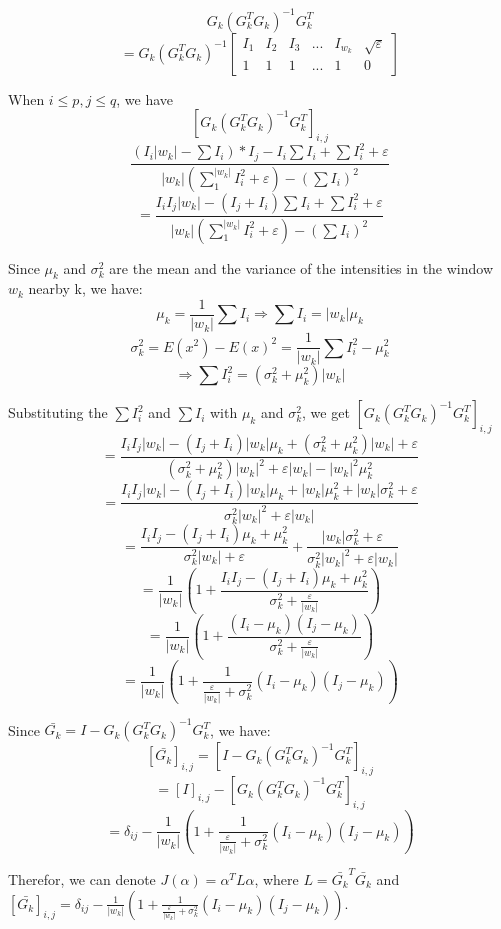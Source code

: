 \documentclass[11pt,letterpaper]{article}
\begin{document}
$$G_k(G_k^TG_k)^{-1}G_k^T $$
$$= G_k(G_k^TG_k)^{-1}
  \begin{bmatrix}
    I_1 & I_2 & I_3 & ... & I_{w_k} & \sqrt{\varepsilon}\\
    1 & 1 & 1 & ... & 1 & 0 
  \end{bmatrix} $$

When $i \le p, j \le q$, we have 
$$[G_k(G_k^TG_k)^{-1}G_k^T]_{i, j} $$
$$ \frac{(I_i |w_k| - \sum I_i) * I_j - I_i \sum I_i + \sum I_i^2 + \varepsilon}{|w_k|(\sum_{1}^{|w_k|} I_i^2 + \varepsilon) - (\sum I_i)^2}$$
$$= \frac{I_i I_j |w_k| - (I_j + I_i)\sum I_i + \sum I_i^2 + \varepsilon}{|w_k|(\sum_{1}^{|w_k|} I_i^2 + \varepsilon) - (\sum I_i)^2}$$

Since $\mu_k$ and $\sigma_k^2$ are the mean and the variance of the intensities in the window $w_k$  nearby k, we have:
$$\mu_k = \frac{1}{|w_k|}\sum I_i \Rightarrow \sum I_i = |w_k|\mu_k$$
$$\sigma_k^2 = E(x^2) - E(x)^2 = \frac{1}{|w_k|}\sum I_i^2 - \mu_k^2 $$
$$\Rightarrow \sum I_i^2 = (\sigma_k^2 + \mu_k^2)|w_k|$$

Substituting the $\sum I_i^2$ and $\sum I_i$ with $\mu_k$ and $\sigma_k^2$, we get
$[G_k(G_k^TG_k)^{-1}G_k^T]_{i, j}$
$$= \frac{I_i I_j |w_k| - (I_j + I_i)|w_k|\mu_k + (\sigma_k^2 + \mu_k^2)|w_k| + \varepsilon}{(\sigma_k^2 + \mu_k^2)|w_k|^2 + \varepsilon|w_k| - |w_k|^2\mu_k^2} $$
$$ = \frac{I_i I_j |w_k| - (I_j + I_i)|w_k|\mu_k + |w_k|\mu_k^2 + |w_k|\sigma_k^2 + \varepsilon}{\sigma_k^2|w_k|^2 + \varepsilon|w_k|}$$
$$ = \frac{I_i I_j - (I_j + I_i)\mu_k + \mu_k^2}{\sigma_k^2|w_k| + \varepsilon} + 
\frac{|w_k|\sigma_k^2 + \varepsilon}{\sigma_k^2|w_k|^2 + \varepsilon|w_k|}$$
$$ = \frac{1}{|w_k|}(1 + \frac{I_i I_j - (I_j + I_i)\mu_k + \mu_k^2}{\sigma_k^2 + \frac{\varepsilon}{|w_k|}})$$
$$= \frac{1}{|w_k|}(1 + \frac{(I_i - \mu_k)(I_j - \mu_k)}{\sigma_k^2 + \frac{\varepsilon}{|w_k|}})$$
$$= \frac{1}{|w_k|}(1 + \frac{1}{\frac{\varepsilon}{|w_k|} + \sigma_k^2}(I_i - \mu_k)(I_j - \mu_k))$$

Since $\bar{G_k} = I - G_k(G_k^TG_k)^{-1}G_k^T$, we have:
$$[\bar{G_k}]_{i,j} = [I - G_k(G_k^TG_k)^{-1}G_k^T]_{i,j} $$
$$= [I]_{i,j} - [G_k(G_k^TG_k)^{-1}G_k^T]_{i,j}$$
$$= \delta_{ij} - \frac{1}{|w_k|}(1 + \frac{1}{\frac{\varepsilon}{|w_k|} + \sigma_k^2}(I_i - \mu_k)(I_j - \mu_k))$$

Therefor, we can denote $J(\alpha) = \alpha^T L \alpha$, where $L = \bar{G_k}^T\bar{G_k}$ and $[\bar{G_k}]_{i,j} = \delta_{ij} - \frac{1}{|w_k|}(1 + \frac{1}{\frac{\varepsilon}{|w_k|} + \sigma_k^2}(I_i - \mu_k)(I_j - \mu_k)).$
\end{document}
